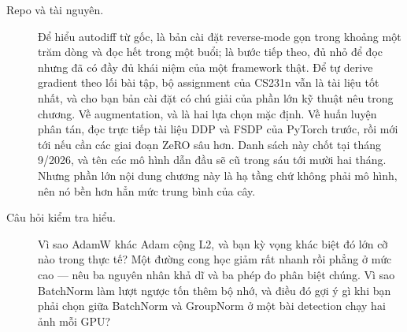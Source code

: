 \documentclass[../../deep_learning.tex]{subfiles}
\begin{document}
\begin{description}
\item[Repo và tài nguyên.] Để hiểu autodiff từ gốc,  là bản cài đặt reverse-mode gọn trong khoảng một trăm dòng và đọc hết trong một buổi;  là bước tiếp theo, đủ nhỏ để đọc nhưng đã có đầy đủ khái niệm của một framework thật. Để tự derive gradient theo lối bài tập, bộ assignment của CS231n vẫn là tài liệu tốt nhất, và  cho bạn bản cài đặt có chú giải của phần lớn kỹ thuật nêu trong chương. Về augmentation,  và  là hai lựa chọn mặc định. Về huấn luyện phân tán, đọc trực tiếp tài liệu DDP và FSDP của PyTorch trước, rồi mới tới  nếu cần các giai đoạn ZeRO sâu hơn. Danh sách này chốt tại tháng 9/2026, và tên các mô hình dẫn đầu sẽ cũ trong sáu tới mười hai tháng. Nhưng phần lớn nội dung chương này là hạ tầng chứ không phải mô hình, nên nó bền hơn hẳn mức trung bình của cây.
\item[Câu hỏi kiểm tra hiểu.] Vì sao AdamW khác Adam cộng L2, và bạn kỳ vọng khác biệt đó lớn cỡ nào trong thực tế? Một đường cong học giảm rất nhanh rồi phẳng ở mức cao --- nêu ba nguyên nhân khả dĩ và ba phép đo phân biệt chúng. Vì sao BatchNorm làm lượt ngược tốn thêm bộ nhớ, và điều đó gợi ý gì khi bạn phải chọn giữa BatchNorm và GroupNorm ở một bài detection chạy hai ảnh mỗi GPU?
\end{description}
\end{document}

